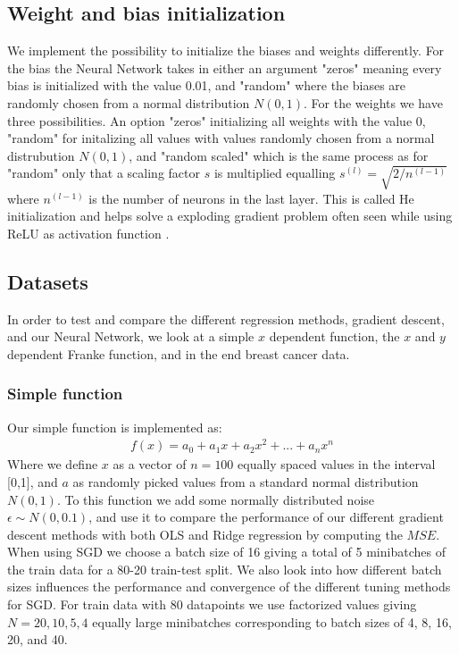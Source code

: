 \documentclass[11pt]{article}
\begin{document}
\subsection{Weight and bias initialization}
We implement the possibility to initialize the biases and weights differently. For the bias the Neural Network takes in either an argument "zeros" meaning every bias is initialized with the value 0.01, and "random" where the biases are randomly chosen from a normal distribution $N(0,1)$. For the weights we have three possibilities. An option "zeros" initializing all weights with the value 0, "random" for initalizing all values with values randomly chosen from a normal distrubution $N(0,1)$, and "random scaled" which is the same process as for "random" only that a scaling factor $s$ is multiplied equalling $s^{(l)}=\sqrt{2/n^{(l-1)}}$ where $n^{(l-1)}$ is the number of neurons in the last layer. This is called He initialization and helps solve a exploding gradient problem often seen while using ReLU as activation function \cite{he}\cite{he_2}.

\subsection{Datasets}
In order to test and compare the different regression methods, gradient descent, and our Neural Network, we look at a simple $x$ dependent function, the $x$ and $y$ dependent Franke function, and in the end breast cancer data.

\subsubsection*{Simple function}
Our simple function is implemented as:
\begin{align*}
  f(x) = a_0 + a_1 x + a_2 x^2 + ... + a_n x^n
\end{align*}
Where we define $x$ as a vector of $n=100$ equally spaced values in the interval [0,1], and $a$ as randomly picked values from a standard normal distribution $N(0,1)$.
To this function we add some normally distributed noise $\epsilon\sim N(0,0.1)$, and use it to compare the performance of our different gradient descent methods  with both OLS and Ridge regression by computing the $MSE$. When using SGD we choose a batch size of 16 giving a total of 5 minibatches of the train data for a 80-20 train-test split. We also look into how different batch sizes influences the performance and convergence of the different tuning methods for SGD. For train data with 80 datapoints we use factorized values giving $N=20, 10, 5, 4$ equally large minibatches corresponding to batch sizes of 4, 8, 16, 20, and 40.
\end{document}
